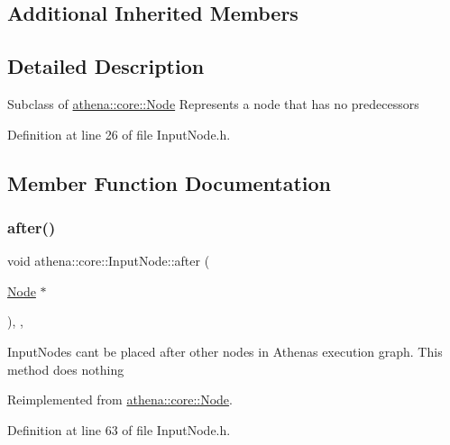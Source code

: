 \subsection*{Additional Inherited Members}


\subsection{Detailed Description}
Subclass of \mbox{\hyperlink{classathena_1_1core_1_1_node}{athena\+::core\+::\+Node}} Represents a node that has no predecessors 

Definition at line 26 of file Input\+Node.\+h.



\subsection{Member Function Documentation}
\mbox{\label{classathena_1_1core_1_1_input_node_aaec12f4c76b6d9890efe1fb4337a1b61}} 
\subsubsection{\texorpdfstring{after()}{after()}}
{\footnotesize\ttfamily void athena\+::core\+::\+Input\+Node\+::after (\begin{DoxyParamCaption}\item[{\mbox{\hyperlink{classathena_1_1core_1_1_node}{Node}} $\ast$}]{ }\end{DoxyParamCaption})\hspace{0.3cm}{\ttfamily [inline]}, {\ttfamily [override]}, {\ttfamily [virtual]}}

Input\+Nodes can\textquotesingle{}t be placed after other nodes in Athena\textquotesingle{}s execution graph. This method does nothing 

Reimplemented from \mbox{\hyperlink{classathena_1_1core_1_1_node_aefef588463c8e215e998415a7cc6b320}{athena\+::core\+::\+Node}}.



Definition at line 63 of file Input\+Node.\+h.

\mbox{\label{classathena_1_1core_1_1_input_node_a983588a56beeb817a59cf9b7e4a63b55}} 
